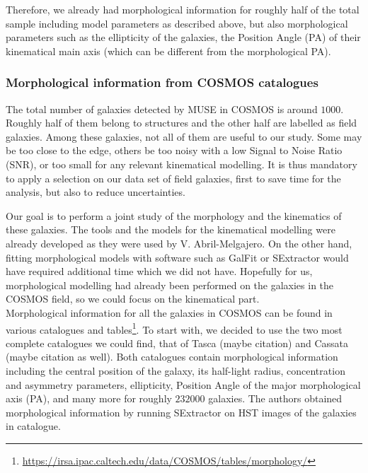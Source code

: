 Therefore, we already had morphological information for roughly half of the total sample including model parameters as described above, but also morphological parameters such as the ellipticity of the galaxies, the Position Angle (PA) of their kinematical main axis (which can be different from the morphological PA).

\subsubsection{Morphological information from COSMOS catalogues}

The total number of galaxies detected by MUSE in COSMOS is around $1000$. Roughly half of them belong to structures and the other half are labelled as field galaxies. Among these galaxies, not all of them are useful to our study. Some may be too close to the edge, others be too noisy with a low Signal to Noise Ratio (SNR), or too small for any relevant kinematical modelling. It is thus mandatory to apply a selection on our data set of field galaxies, first to save time for the analysis, but also to reduce uncertainties.

Our goal is to perform a joint study of the morphology and the kinematics of these galaxies. The tools and the models for the kinematical modelling were already developed as they were used by V. Abril-Melgajero. On the other hand, fitting morphological models with software such as GalFit or SExtractor would have required additional time which we did not have. Hopefully for us, morphological modelling had already been performed on the galaxies in the COSMOS field, so we could focus on the kinematical part. \\

Morphological information for all the galaxies in COSMOS can be found in various catalogues and tables\footnote{\url{https://irsa.ipac.caltech.edu/data/COSMOS/tables/morphology/}}. To start with, we decided to use the two most complete catalogues we could find, that of Tasca (maybe citation) and Cassata (maybe citation as well). Both catalogues contain morphological information including the central position of the galaxy, its half-light radius, concentration and asymmetry parameters, ellipticity, Position Angle of the major morphological axis (PA), and many more for roughly $232 000$ galaxies. The authors obtained morphological information by running SExtractor on HST images of the galaxies in  catalogue. \\

